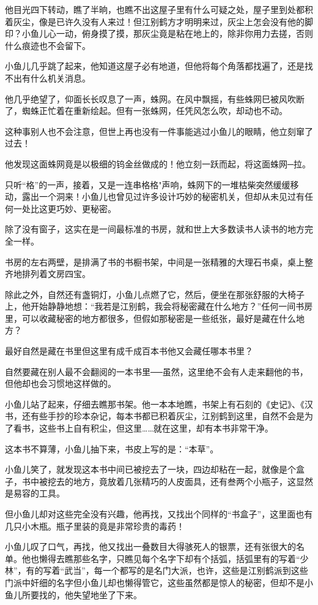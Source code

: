 \documentclass[12pt,oneside]{book}
\begin{document}
他目光四下转动，瞧了半晌，也瞧不出这屋子里有什么可疑之处，屋子里到处都积着灰尘，像是已许久没有人来过！但江别鹤方才明明来过，灰尘上怎会没有他的脚印？小鱼儿心一动，俯身摸了摸，那灰尘竟是粘在地上的，除非你用力去搓，否则什么痕迹也不会留下。

小鱼儿几乎跳了起来，他知道这屋子必有地道，但他将每个角落都找遍了，还是找不出有什么机关消息。

他几乎绝望了，仰面长长叹息了一声，蛛网。在风中飘摇，有些蛛网巳被风吹断了，蜘蛛正忙着在重新绘起。但有一张蛛网，任凭风怎么吹，却动也不动。

这种事别人也不会注意，但世上再也没有一件事能逃过小鱼儿的眼睛，他立刻窜了过去！

他发现这面蛛网竟是以极细的钨金丝做成的！他立刻一跃而起，将这面蛛网─拉。

只听``格''的一声，接着，又是一连串格格"声响，蛛网下的一堆枯柴突然缓缓移动，露出一个洞来！小鱼儿也曾见过许多设计巧妙的秘密机关，但却从未见过有任何一处比这更巧妙、更秘密。

除了没有窗子，这实在是一间最标准的书房，就和世上大多数读书人读书的地方完全一样。

书房的左右两壁，是排满了书的书橱书架，中间是一张精雅的大理石书桌，桌上整齐地排列着文房四宝。

除此之外，自然还有盏铜灯，小鱼儿点燃了它，然后，便坐在那张舒服的大椅子上，他开始静静地想：``我若是江别鹤，我会将秘密藏在什么地方？''任何一间书房里，可以收藏秘密的地方都很多，但假如那秘密是一些纸张，最好是藏在什么地方？

最好自然是藏在书里但这里有成千成百本书他又会藏任哪本书里？

自然要藏在别人最不会翻阅的一本书里──虽然，这里绝不会有人走来翻他的书，但他却也会习惯地这样做的。

小鱼儿站了起来，仔细去瞧那书架。他一本本地瞧，书架上有石刻的《史记》、《汉书，还有些手抄的珍本杂记，每本书都已积着灰尘，江别鹤到这里，自然不会是为了看书，这些书上自有积尘，但这里\ldots\ldots 就在这里，却有本书非常干净。

这本书不算薄，小鱼儿抽下来，书皮上写的是：``本草''。

小鱼儿笑了，就发现这本书中间已被挖去了一块，四边却粘在一起，就像是个盒子，书中被挖去的地方，竟放着几张精巧的人皮面具，还有叁两个小瓶子，这显然是易容的工具。

但小鱼儿却对这些完全没有兴趣，他再找，又找出个同样的``书盒子''，这里面也有几只小木瓶。瓶子里装的竟是非常珍贵的毒药！

小鱼儿叹了口气，再找，他又找出一叠数目大得骇死人的银票，还有张很大的名单。他也懒得去瞧那些名字，只瞧见每个名字下却有个括弧，括弧里有的写着``少林''，有的写着``武当''，每一个都写的是名门大派，也许，这些是江别鹤派到这些门派中奸细的名字但小鱼儿却也懒得管它，这些虽然都是惊人的秘密，但却不是小鱼儿所要找的，他失望地坐了下来。
\end{document}
